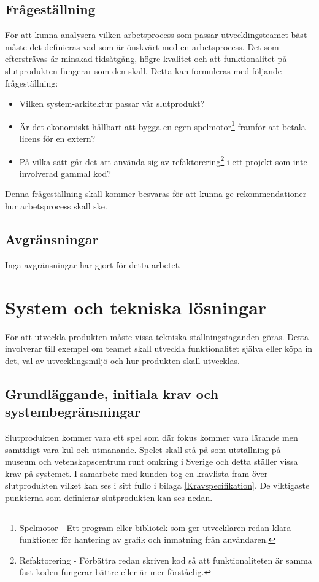 \documentclass[a4paper,12pt,oneside,final]{extbook}
\begin{document}
\section{Frågeställning}
För att kunna analysera vilken arbetsprocess som passar utvecklingsteamet bäst måste det definieras vad som är önskvärt med en arbetsprocess. Det som eftersträvas är minskad tidsåtgång, högre kvalitet och att  funktionalitet på slutprodukten fungerar som den skall. Detta kan formuleras med följande frågeställning: 
\begin{itemize}
	\item Vilken system-arkitektur passar vår slutprodukt? 
	\item Är det ekonomiskt hållbart att bygga en egen spelmotor\footnote{Spelmotor - Ett program eller bibliotek som ger utvecklaren redan klara funktioner för hantering av grafik och inmatning från användaren.} framför att betala licens för en extern?
	\item På vilka sätt går det att använda sig av refaktorering\footnote{Refaktorering - Förbättra redan skriven kod så att funktionaliteten är samma fast koden fungerar bättre eller är mer förståelig\cite{Fowler2000rit}.} i ett projekt som inte involverad gammal kod?

\end{itemize}
Denna frågeställning skall kommer besvaras för att kunna ge rekommendationer hur arbetsprocess skall ske.

\section{Avgränsningar}
Inga avgränsningar har gjort för detta arbetet.


\chapter{System och tekniska lösningar}
För att utveckla produkten måste vissa tekniska ställningstaganden göras. Detta involverar till exempel om teamet skall utveckla funktionalitet själva eller köpa in det, val av utvecklingsmiljö och hur produkten skall utvecklas.

\section{Grundläggande, initiala krav och systembegränsningar}
Slutprodukten kommer vara ett spel som där fokus kommer vara lärande men samtidigt vara kul och utmanande. Spelet skall stå på som utställning på museum och vetenskapscentrum runt omkring i Sverige och detta ställer vissa krav på systemet. I samarbete med kunden tog en kravlista fram över slutprodukten vilket kan ses i sitt fullo i bilaga \ref{Kravspecifikation}. De viktigaste punkterna som definierar slutprodukten kan ses nedan.
\end{document}
